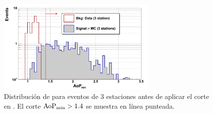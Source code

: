 	\begin{figure}[ht]
	\begin{center}
	\includegraphics[width=0.7\textwidth]{fig/seleccionAuger/minAoP_forThesis}
	\caption{Distribución de \aopmin{} para eventos de 3 estaciones antes de aplicar el corte en \aop{}. El corte ${\rm AoP_{min}}>1.4$ se muestra en línea punteada.}
	\label{fig:minAoP}
	\end{center}
	\end{figure}
	
